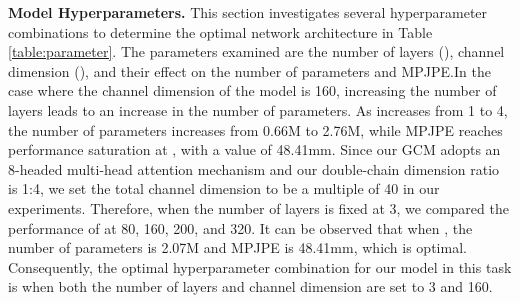 \documentclass[journal]{IEEEtran}
\begin{document}
\begin{table}[ht]
\caption{Ablation study on the hyperparameters of our model.  denotes the number of layers,  denotes the channel dimension.}
\label{table:parameter}
\centering {}
\end{table}


{\bf{Model Hyperparameters.}} This section investigates several hyperparameter combinations to determine the optimal network architecture in Table \ref{table:parameter}. The parameters examined are the number of layers (), channel dimension (), and their effect on the number of parameters and MPJPE.In the case where the channel dimension of the model is 160, increasing the number of layers leads to an increase in the number of parameters. As  increases from 1 to 4, the number of parameters increases from 0.66M to 2.76M, while MPJPE reaches performance saturation at , with a value of 48.41mm. Since our GCM adopts an 8-headed multi-head attention mechanism and our double-chain dimension ratio is 1:4, we set the total channel dimension to be a multiple of 40 in our experiments. Therefore, when the number of layers is fixed at 3, we compared the performance of  at 80, 160, 200, and 320. It can be observed that when , the number of parameters is 2.07M and MPJPE is 48.41mm, which is optimal. Consequently, the optimal hyperparameter combination for our model in this task is when both the number of layers and channel dimension are set to 3 and 160.
\end{document}
